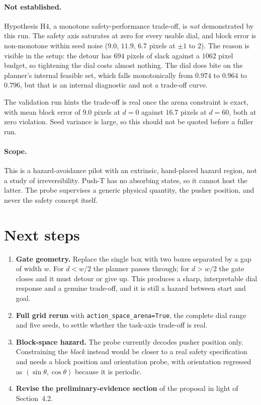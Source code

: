 \documentclass[11pt,a4paper]{article}
\newcommand{\dial}{\ensuremath{d}}
\begin{document}
\paragraph{Not established.} Hypothesis H4, a monotone safety-performance trade-off, is
\emph{not} demonstrated by this run. The safety axis saturates at zero for every usable dial,
and block error is non-monotone within seed noise ($9.0$, $11.9$, $6.7$ pixels at $\pm 1$ to
$2$). The reason is visible in the setup: the detour has $694$ pixels of slack against a
$1062$ pixel budget, so tightening the dial costs almost nothing. The dial does bite on the
planner's internal feasible set, which falls monotonically from $0.974$ to $0.964$ to $0.796$,
but that is an internal diagnostic and not a trade-off curve.

The validation run hints the trade-off is real once the arena constraint is exact, with mean
block error of $9.0$ pixels at $\dial = 0$ against $16.7$ pixels at $\dial = 60$, both at zero
violation. Seed variance is large, so this should not be quoted before a fuller run.

\paragraph{Scope.} This is a hazard-avoidance pilot with an extrinsic, hand-placed hazard
region, not a study of irreversibility. Push-T has no absorbing states, so it cannot host the
latter. The probe supervises a generic physical quantity, the pusher position, and never the
safety concept itself.

\section{Next steps}

\begin{enumerate}
  \item \textbf{Gate geometry.} Replace the single box with two boxes separated by a gap of
    width $w$. For $\dial < w/2$ the planner passes through; for $\dial > w/2$ the gate closes
    and it must detour or give up. This produces a sharp, interpretable dial response and a
    genuine trade-off, and it is still a hazard between start and goal.
  \item \textbf{Full grid rerun} with \texttt{action\_space\_arena=True}, the complete dial
    range and five seeds, to settle whether the task-axis trade-off is real.
  \item \textbf{Block-space hazard.} The probe currently decodes pusher position only.
    Constraining the \emph{block} instead would be closer to a real safety specification and
    needs a block position and orientation probe, with orientation regressed as
    $(\sin\theta, \cos\theta)$ because it is periodic.
  \item \textbf{Revise the preliminary-evidence section} of the proposal in light of
    Section~4.2.
\end{enumerate}
\end{document}
